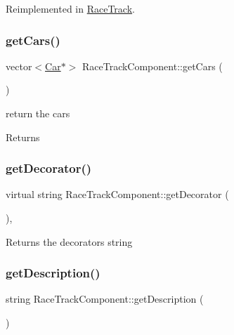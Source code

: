 Reimplemented in \mbox{\hyperlink{class_race_track_abc68bb4172e9db6ebe3dbfb584691512}{Race\+Track}}.

\mbox{\label{class_race_track_component_a5bb16c76fd5335c9d1a951b9de5ea48c}} 
\subsubsection{\texorpdfstring{get\+Cars()}{getCars()}}
{\footnotesize\ttfamily vector$<$\mbox{\hyperlink{class_car}{Car}}$\ast$$>$ Race\+Track\+Component\+::get\+Cars (\begin{DoxyParamCaption}{ }\end{DoxyParamCaption})\hspace{0.3cm}{\ttfamily [inline]}}

return the cars \begin{DoxyReturn}{Returns}

\end{DoxyReturn}
\mbox{\label{class_race_track_component_a2998bbf7b576eff0e355166646ed46e8}} 
\subsubsection{\texorpdfstring{get\+Decorator()}{getDecorator()}}
{\footnotesize\ttfamily virtual string Race\+Track\+Component\+::get\+Decorator (\begin{DoxyParamCaption}{ }\end{DoxyParamCaption})\hspace{0.3cm}{\ttfamily [inline]}, {\ttfamily [virtual]}}

\begin{DoxyReturn}{Returns}
the decorators string 
\end{DoxyReturn}
\mbox{\label{class_race_track_component_a443780d8534a8799fbcde14aa7b540c2}} 
\subsubsection{\texorpdfstring{get\+Description()}{getDescription()}}
{\footnotesize\ttfamily string Race\+Track\+Component\+::get\+Description (\begin{DoxyParamCaption}{ }\end{DoxyParamCaption})\hspace{0.3cm}{\ttfamily [inline]}}

